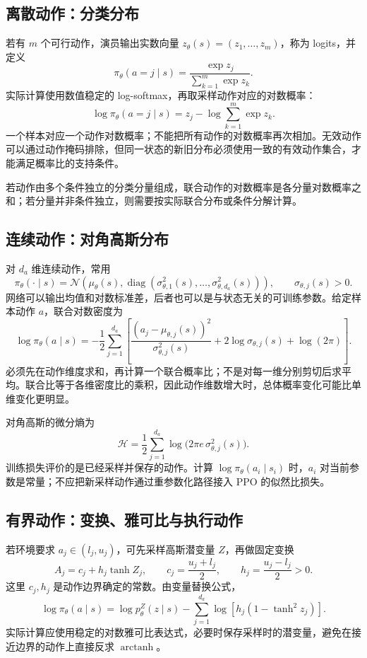 \documentclass[UTF8]{ctexart}
\begin{document}
\subsection{离散动作：分类分布}

若有 $m$ 个可行动作，演员输出实数向量
$z_\theta(s)=(z_1,\ldots,z_m)$，称为 logits，并定义
\[
  \pi_\theta(a=j\mid s)
  =\frac{\exp z_j}{\sum_{k=1}^m\exp z_k}.
\]
实际计算使用数值稳定的 log-softmax，再取采样动作对应的对数概率：
\[
  \log\pi_\theta(a=j\mid s)
  =z_j-\log\sum_{k=1}^m\exp z_k.
\]
一个样本对应一个动作对数概率；不能把所有动作的对数概率再次相加。无效动作可以通过动作掩码排除，但同一状态的新旧分布必须使用一致的有效动作集合，才能满足概率比的支持条件。

若动作由多个条件独立的分类分量组成，联合动作的对数概率是各分量对数概率之和；若分量并非条件独立，则需要按实际联合分布或条件分解计算。

\subsection{连续动作：对角高斯分布}

对 $d_a$ 维连续动作，常用
\[
  \pi_\theta(\cdot\mid s)
  =\mathcal N\!\left(
    \mu_\theta(s),\operatorname{diag}(\sigma_{\theta,1}^2(s),
    \ldots,\sigma_{\theta,d_a}^2(s))\right),
  \qquad \sigma_{\theta,j}(s)>0.
\]
网络可以输出均值和对数标准差，后者也可以是与状态无关的可训练参数。给定样本动作 $a$，联合对数密度为
\begin{equation}
  \log\pi_\theta(a\mid s)
  =-\frac12\sum_{j=1}^{d_a}
    \left[
      \frac{(a_j-\mu_{\theta,j}(s))^2}{\sigma_{\theta,j}^2(s)}
      +2\log\sigma_{\theta,j}(s)+\log(2\pi)
    \right].
  \label{eq:ppo-gaussian-logprob}
\end{equation}
必须先在动作维度求和，再计算一个联合概率比；不是对每一维分别剪切后求平均。联合比等于各维密度比的乘积，因此动作维数增大时，总体概率变化可能比单维变化更明显。

对角高斯的微分熵为
\[
  \mathcal H
  =\frac12\sum_{j=1}^{d_a}
      \log\bigl(2\pi e\,\sigma_{\theta,j}^2(s)\bigr).
\]
训练损失评价的是已经采样并保存的动作。计算
$\log\pi_\theta(a_i\mid s_i)$ 时，$a_i$ 对当前参数是常量；不应把新采样动作通过重参数化路径接入 PPO 的似然比损失。

\subsection{有界动作：变换、雅可比与执行动作}

若环境要求 $a_j\in(l_j,u_j)$，可先采样高斯潜变量 $Z$，再做固定变换
\[
  A_j=c_j+h_j\tanh Z_j,\qquad
  c_j=\frac{u_j+l_j}{2},\qquad h_j=\frac{u_j-l_j}{2}>0.
\]
这里 $c_j,h_j$ 是动作边界确定的常数。由变量替换公式，
\begin{equation}
  \log\pi_\theta(a\mid s)
  =\log p_\theta^Z(z\mid s)
   -\sum_{j=1}^{d_a}
     \log\!\left[h_j(1-\tanh^2z_j)\right].
  \label{eq:ppo-squashed-logprob}
\end{equation}
实际计算应使用稳定的对数雅可比表达式，必要时保存采样时的潜变量，避免在接近边界的动作上直接反求 $\operatorname{arctanh}$。
\end{document}
